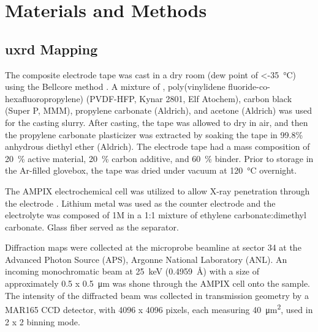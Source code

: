 \documentclass{article}
\begin{document}
\section*{Materials and Methods}
\label{sec:methods}

\subsection*{\gls{uxrd} Mapping}

The \nca{} composite electrode tape was cast in a dry room (dew point
of \SI{<-35}{\celsius}) using the Bellcore method \cite{warren1996}. A
mixture of \nca{}, poly(vinylidene fluoride-co-hexafluoropropylene)
(PVDF-HFP, Kynar 2801, Elf Atochem), carbon black (Super P, MMM),
propylene carbonate (Aldrich), and acetone (Aldrich) was used for the
casting slurry. After casting, the tape was allowed to dry in air, and
then the propylene carbonate plasticizer was extracted by soaking the
tape in 99.8\% anhydrous diethyl ether (Aldrich). The electrode tape
had a mass composition of \SI{20}{\percent} active material,
\SI{20}{\percent} carbon additive, and \SI{60}{\percent} binder. Prior
to storage in the Ar-filled glovebox, the tape was dried under vacuum
at \SI{120}{\celsius} overnight.

The AMPIX electrochemical cell was utilized to allow X-ray penetration
through the electrode \cite{borkiewicz2012}. Lithium metal was used as
the counter electrode and the electrolyte was composed of 1M
 in a 1:1 mixture of ethylene carbonate:dimethyl
carbonate. Glass fiber served as the separator.

Diffraction maps were collected at the microprobe beamline at sector
34 at the Advanced Photon Source (APS), Argonne National Laboratory
(ANL). An incoming monochromatic beam at \SI{25}{\kilo\electronvolt}
(\SI{0.4959}{\angstrom}) with a size of approximately \num{0.5} x
\SI{0.5}{\micro\meter} was shone through the AMPIX cell onto the
sample. The intensity of the diffracted beam was collected in
transmission geometry by a MAR165 CCD detector, with 4096 x 4096
pixels, each measuring \SI{40}{\square\micro\meter}, used in 2 x 2
binning mode.
\end{document}
